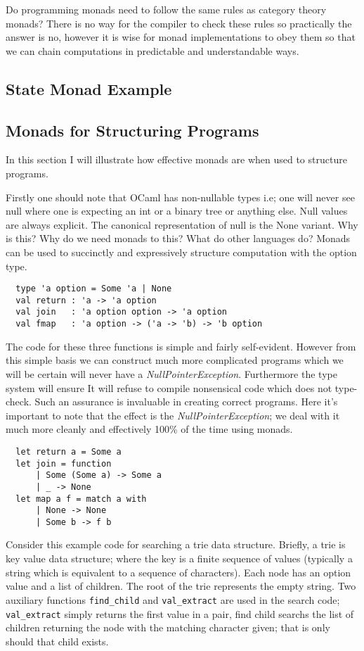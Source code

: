 \documentclass[a4paper,10pt]{article}
\theoremstyle{definition}
\begin{document}
Do programming monads need to follow the same rules as category theory monads?
There is no way for the compiler to check these rules so practically the answer is no,
however it is wise for monad implementations to obey them so that
we can chain computations in predictable and understandable ways.

\subsection{State Monad Example}

\subsection{Monads for Structuring Programs}
In this section I will illustrate how effective monads are when used to structure programs.

Firstly one should note that OCaml has non-nullable types
i.e; one will never see null where one is expecting an
int or a binary tree or anything else.
Null values are always explicit.
The canonical representation of null is the None variant.
Why is this?
Why do we need monads to this?
What do other languages do?
Monads can be used to succinctly and expressively structure computation with the option type.

\begin{verbatim}
  type 'a option = Some 'a | None
  val return : 'a -> 'a option
  val join   : 'a option option -> 'a option
  val fmap   : 'a option -> ('a -> 'b) -> 'b option
\end{verbatim}

The code for these three functions is simple and fairly self-evident.
However from this simple basis we can construct much more complicated programs which we
will be certain will never have a \textit{NullPointerException}.
Furthermore the type system will ensure 
It will refuse to compile nonsensical code which does not type-check.
Such an assurance is invaluable in creating correct programs.
Here it's important to note that the effect is the \textit{NullPointerException};
we deal with it much more cleanly and effectively 100\% of the time using monads.

\begin{verbatim}
  let return a = Some a
  let join = function
      | Some (Some a) -> Some a
      | _ -> None
  let map a f = match a with
      | None -> None
      | Some b -> f b
\end{verbatim}

Consider this example code for searching a trie data structure.
Briefly, a trie is key value data structure;
where the key is a finite sequence of values
(typically a string which is equivalent to a sequence of characters).
Each node has an option value and a list of children.
The root of the trie represents the empty string.
Two auxiliary functions \texttt{find\_child} and \texttt{val\_extract}
are used in the search code; \texttt{val\_extract}
simply returns the first value in a pair,
find child searchs the list of children returning
the node with the matching character given;
that is only should that child exists.
\end{document}
